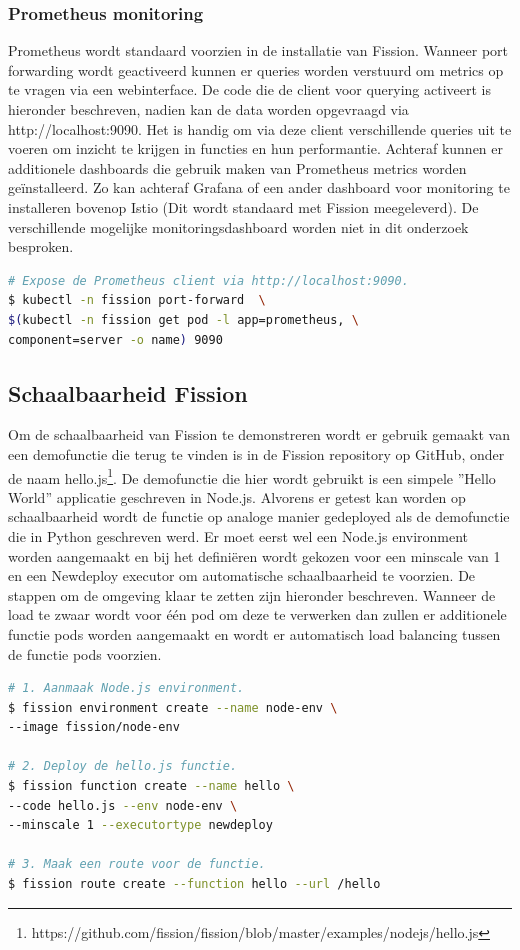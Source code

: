 \subsubsection{Prometheus monitoring}
Prometheus wordt standaard voorzien in de installatie van Fission. Wanneer port forwarding wordt geactiveerd kunnen er queries worden verstuurd om metrics op te vragen via een webinterface. De code die de client voor querying activeert is hieronder beschreven, nadien kan de data worden opgevraagd via http://localhost:9090. Het is handig om via deze client verschillende queries uit te voeren om inzicht te krijgen in functies en hun performantie. Achteraf kunnen er additionele dashboards die gebruik maken van Prometheus metrics worden geïnstalleerd. Zo kan achteraf Grafana of een ander dashboard voor monitoring te installeren bovenop Istio (Dit wordt standaard met Fission meegeleverd). De verschillende mogelijke monitoringsdashboard worden niet in dit onderzoek besproken.

\begin{lstlisting}[language=bash]
# Expose de Prometheus client via http://localhost:9090.
$ kubectl -n fission port-forward  \ 
$(kubectl -n fission get pod -l app=prometheus, \
component=server -o name) 9090
\end{lstlisting}

\subsection{Schaalbaarheid Fission}
Om de schaalbaarheid van Fission te demonstreren wordt er gebruik gemaakt van een demofunctie die terug te vinden is in de Fission repository op GitHub, onder de naam hello.js\footnote{https://github.com/fission/fission/blob/master/examples/nodejs/hello.js}. De demofunctie die hier wordt gebruikt is een simpele ''Hello World'' applicatie geschreven in Node.js. Alvorens er getest kan worden op schaalbaarheid wordt de functie op analoge manier gedeployed als de demofunctie die in Python geschreven werd. Er moet eerst wel een Node.js environment worden aangemaakt en bij het definiëren wordt gekozen voor een minscale van 1 en een Newdeploy executor om automatische schaalbaarheid te voorzien. De stappen om de omgeving klaar te zetten zijn hieronder beschreven. Wanneer de load te zwaar wordt voor één pod om deze te verwerken dan zullen er additionele functie pods worden aangemaakt en wordt er automatisch load balancing tussen de functie pods voorzien.

\begin{lstlisting}[language=bash]
# 1. Aanmaak Node.js environment.
$ fission environment create --name node-env \
--image fission/node-env

# 2. Deploy de hello.js functie.
$ fission function create --name hello \
--code hello.js --env node-env \
--minscale 1 --executortype newdeploy

# 3. Maak een route voor de functie.
$ fission route create --function hello --url /hello
\end{lstlisting}

